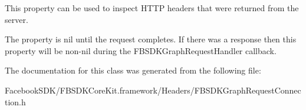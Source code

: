 This property can be used to inspect H\-T\-T\-P headers that were returned from the server.

The property is nil until the request completes. If there was a response then this property will be non-\/nil during the F\-B\-S\-D\-K\-Graph\-Request\-Handler callback. 

The documentation for this class was generated from the following file\-:\begin{DoxyCompactItemize}
\item 
Facebook\-S\-D\-K/\-F\-B\-S\-D\-K\-Core\-Kit.\-framework/\-Headers/F\-B\-S\-D\-K\-Graph\-Request\-Connection.\-h\end{DoxyCompactItemize}
